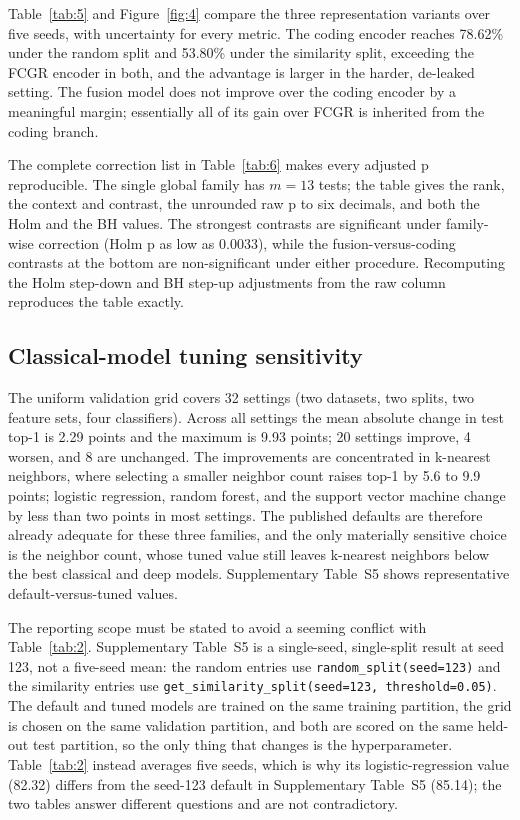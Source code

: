 \documentclass[utf8]{FrontiersinVancouver}
\begin{document}
Table~\ref{tab:5} and Figure~\ref{fig:4} compare the three representation variants over five seeds, with uncertainty for every metric. The coding encoder reaches 78.62\% under the random split and 53.80\% under the similarity split, exceeding the FCGR encoder in both, and the advantage is larger in the harder, de-leaked setting. The fusion model does not improve over the coding encoder by a meaningful margin; essentially all of its gain over FCGR is inherited from the coding branch.

The complete correction list in Table~\ref{tab:6} makes every adjusted p reproducible. The single global family has $m=13$ tests; the table gives the rank, the context and contrast, the unrounded raw p to six decimals, and both the Holm and the BH values. The strongest contrasts are significant under family-wise correction (Holm p as low as 0.0033), while the fusion-versus-coding contrasts at the bottom are non-significant under either procedure. Recomputing the Holm step-down and BH step-up adjustments from the raw column reproduces the table exactly.

\subsection{Classical-model tuning sensitivity}

The uniform validation grid covers 32 settings (two datasets, two splits, two feature sets, four classifiers). Across all settings the mean absolute change in test top-1 is 2.29 points and the maximum is 9.93 points; 20 settings improve, 4 worsen, and 8 are unchanged. The improvements are concentrated in k-nearest neighbors, where selecting a smaller neighbor count raises top-1 by 5.6 to 9.9 points; logistic regression, random forest, and the support vector machine change by less than two points in most settings. The published defaults are therefore already adequate for these three families, and the only materially sensitive choice is the neighbor count, whose tuned value still leaves k-nearest neighbors below the best classical and deep models. Supplementary Table~S5 shows representative default-versus-tuned values.

The reporting scope must be stated to avoid a seeming conflict with Table~\ref{tab:2}. Supplementary Table~S5 is a single-seed, single-split result at seed 123, not a five-seed mean: the random entries use \texttt{random\_split(seed=123)} and the similarity entries use \texttt{get\_similarity\_split(seed=123, threshold=0.05)}. The default and tuned models are trained on the same training partition, the grid is chosen on the same validation partition, and both are scored on the same held-out test partition, so the only thing that changes is the hyperparameter. Table~\ref{tab:2} instead averages five seeds, which is why its logistic-regression value (82.32) differs from the seed-123 default in Supplementary Table~S5 (85.14); the two tables answer different questions and are not contradictory.
\end{document}
